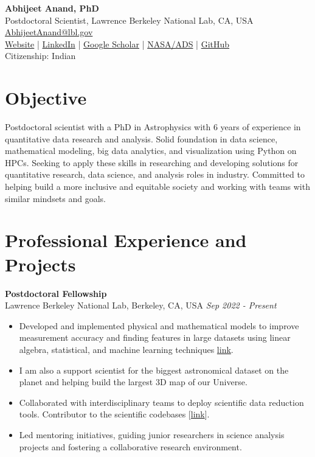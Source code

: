\documentclass[a4paper,11pt]{article}
\begin{document}
\begin{center}
    {\LARGE \textbf{Abhijeet Anand, PhD}} \\
    Postdoctoral Scientist, Lawrence Berkeley National Lab, CA, USA \\
    \href{mailto:AbhijeetAnand@lbl.gov}{AbhijeetAnand@lbl.gov} \\
     \href{https://abhi0395.github.io/}{Website}  | \href{https://www.linkedin.com/in/abhijeet-anand-iisc}{LinkedIn} | \href{https://scholar.google.com/citations?hl=en&user=MfOuq1IAAAAJ}{Google Scholar} | \href{https://ui.adsabs.harvard.edu/public-libraries/YPXGQEsNQg-zR9R9YBYFXw}{NASA/ADS} | \href{https://github.com/abhi0395}{GitHub}\\
    Citizenship: Indian\\
\end{center}

\vspace{0.5cm}

\section*{Objective}
Postdoctoral scientist with a PhD in Astrophysics with 6 years of experience in quantitative data research and analysis.
Solid foundation in data science, mathematical modeling, big data analytics, and visualization using Python on HPCs. Seeking to
apply these skills in researching and developing solutions for quantitative research, data science, and analysis roles in industry. Committed to helping build a more inclusive and equitable society and working with teams with similar mindsets and goals.

\section*{Professional Experience and Projects}
\noindent
\textbf{Postdoctoral Fellowship} \\
Lawrence Berkeley National Lab, Berkeley, CA, USA \hfill \textit{Sep 2022 - Present} \\
\begin{itemize}[noitemsep, topsep=0pt]
    \item Developed and implemented physical and mathematical models to improve measurement accuracy and finding features in large datasets using linear algebra, statistical, and machine learning techniques \href{https://github.com/desihub/redrock}{link}. 
    \item I am also a support scientist for the biggest astronomical dataset on the planet and helping build the largest 3D map of our Universe.
     \item Collaborated with interdisciplinary teams to deploy scientific data reduction tools. Contributor to the scientific codebases [\href{https://github.com/desihub}{link}].
        \item Led mentoring initiatives, guiding junior researchers in science analysis projects and fostering a collaborative research environment.
\end{itemize}
\end{document}
